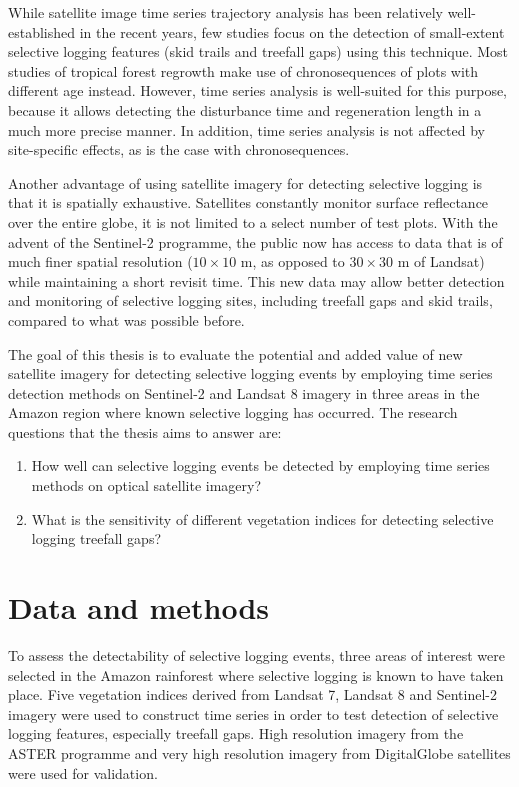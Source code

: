 \documentclass[a4paper,12pt]{scrbook}
\begin{document}
While satellite image time series trajectory analysis has been relatively well-established in the recent years, few studies focus on the detection of small-extent selective logging features (skid trails and treefall gaps) using this technique. Most studies of tropical forest regrowth make use of chronosequences of plots with different age instead. However, time series analysis is well-suited for this purpose, because it allows detecting the disturbance time and regeneration length in a much more precise manner. In addition, time series analysis is not affected by site-specific effects, as is the case with chronosequences.

Another advantage of using satellite imagery for detecting selective logging is that it is spatially exhaustive. Satellites constantly monitor surface reflectance over the entire globe, it is not limited to a select number of test plots. With the advent of the Sentinel-2 programme, the public now has access to data that is of much finer spatial resolution ($10\times10$ m, as opposed to $30\times30$ m of Landsat) while maintaining a short revisit time. This new data may allow better detection and monitoring of selective logging sites, including treefall gaps and skid trails, compared to what was possible before.

The goal of this thesis is to evaluate the potential and added value of new satellite imagery for detecting selective logging events by employing time series detection methods on Sentinel-2 and Landsat 8 imagery in three areas in the Amazon region where known selective logging has occurred. The research questions that the thesis aims to answer are:

\begin{enumerate}
 \item How well can selective logging events be detected by employing time series methods on optical satellite imagery?
 \item What is the sensitivity of different vegetation indices for detecting selective logging treefall gaps?
\end{enumerate}

\chapter{Data and methods}

To assess the detectability of selective logging events, three areas of interest were selected in the Amazon rainforest where selective logging is known to have taken place. Five vegetation indices derived from Landsat 7, Landsat 8 and Sentinel-2 imagery were used to construct time series in order to test detection of selective logging features, especially treefall gaps. High resolution imagery from the \ac{ASTER} programme and very high resolution imagery from DigitalGlobe satellites were used for validation.
\end{document}

